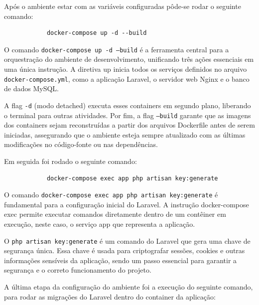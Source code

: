            \par Após o ambiente estar com as variáveis configuradas pôde-se rodar o seguinte comando:

            \begin{verbatim}
            docker-compose up -d --build
            \end{verbatim}

            \par O comando \texttt{docker-compose up -d --build} é a ferramenta central para a orquestração do ambiente de desenvolvimento, unificando três ações essenciais em uma única instrução. A diretiva up inicia todos os serviços definidos no arquivo \texttt{docker-compose.yml}, como a aplicação Laravel, o servidor web Nginx e o banco de dados MySQL. 
            
            \par A flag \texttt{-d} (modo detached) executa esses containers em segundo plano, liberando o terminal para outras atividades. Por fim, a flag \texttt{--build} garante que as imagens dos containers sejam reconstruídas a partir dos arquivos Dockerfile antes de serem iniciadas, assegurando que o ambiente esteja sempre atualizado com as últimas modificações no código-fonte ou nas dependências.

            \par Em seguida foi rodado o seguinte comando:

            \begin{verbatim}
            docker-compose exec app php artisan key:generate
            \end{verbatim}

            \par O comando \texttt{docker-compose exec app php artisan key:generate} é fundamental para a configuração inicial do Laravel. A instrução docker-compose exec permite executar comandos diretamente dentro de um contêiner em execução, neste caso, o serviço app que representa a aplicação.
            
            \par O \texttt{php artisan key:generate} é um comando do Laravel que gera uma chave de segurança única. Essa chave é usada para criptografar sessões, cookies e outras informações sensíveis da aplicação, sendo um passo essencial para garantir a segurança e o correto funcionamento do projeto.

            \par A última etapa da configuração do ambiente foi a execução do seguinte comando, para rodar as migrações do Laravel dentro do container da aplicação:
            
